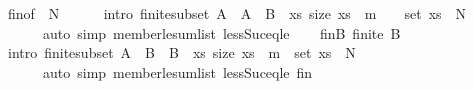 \begin{isabellebody}
\ fin{\isacharbrackleft}{\kern0pt}of\ {\isacharunderscore}{\kern0pt}\ {\isachardoublequoteopen}N{\isacharplus}{\kern0pt}{}{\isachardoublequoteclose}{\isacharbrackright}{\kern0pt}\isanewline
\ \ \ \ \isamarkupfalse%
\ {\isacharparenleft}{\kern0pt}intro\ finite{\isacharunderscore}{\kern0pt}subset{\isacharbrackleft}{\kern0pt}\ {\isacharquery}{\kern0pt}A\ {\isacharequal}{\kern0pt}\ {\isachardoublequoteopen}{\isacharquery}{\kern0pt}A{\isachardoublequoteclose}\ \ {\isacharquery}{\kern0pt}B\ {\isacharequal}{\kern0pt}\ {\isachardoublequoteopen}{\isacharbraceleft}{\kern0pt}xs{\isachardot}{\kern0pt}\ size\ xs\ {\isacharequal}{\kern0pt}\ m\ {\isacharminus}{\kern0pt}\ {}\ {\isasymand}\ set\ xs\ {\isasymsubseteq}\ {\isacharbraceleft}{\kern0pt}{}{\isachardot}{\kern0pt}{\isachardot}{\kern0pt}{\isacharless}{\kern0pt}N{\isacharplus}{\kern0pt}{}{\isacharbraceright}{\kern0pt}{\isacharbraceright}{\kern0pt}{\isachardoublequoteclose}{\isacharbrackright}{\kern0pt}{\isacharparenright}{\kern0pt}\isanewline
\ \ \ \ \ \ {\isacharparenleft}{\kern0pt}auto\ simp{\isacharcolon}{\kern0pt}\ member{\isacharunderscore}{\kern0pt}le{\isacharunderscore}{\kern0pt}sum{\isacharunderscore}{\kern0pt}list\ less{\isacharunderscore}{\kern0pt}Suc{\isacharunderscore}{\kern0pt}eq{\isacharunderscore}{\kern0pt}le{\isacharparenright}{\kern0pt}\isanewline
\ \ \isamarkupfalse%
\ fin{\isacharunderscore}{\kern0pt}B{\isacharcolon}{\kern0pt}\ {\isachardoublequoteopen}finite\ {\isacharquery}{\kern0pt}B{\isachardoublequoteclose}\isanewline
\ \ \ \ \isamarkupfalse%
\ {\isacharparenleft}{\kern0pt}intro\ finite{\isacharunderscore}{\kern0pt}subset{\isacharbrackleft}{\kern0pt}\ {\isacharquery}{\kern0pt}A\ {\isacharequal}{\kern0pt}\ {\isachardoublequoteopen}{\isacharquery}{\kern0pt}B{\isachardoublequoteclose}\ \ {\isacharquery}{\kern0pt}B\ {\isacharequal}{\kern0pt}\ {\isachardoublequoteopen}{\isacharbraceleft}{\kern0pt}xs{\isachardot}{\kern0pt}\ size\ xs\ {\isacharequal}{\kern0pt}\ m\ {\isasymand}\ set\ xs\ {\isasymsubseteq}\ {\isacharbraceleft}{\kern0pt}{}{\isachardot}{\kern0pt}{\isachardot}{\kern0pt}{\isacharless}{\kern0pt}N{\isacharbraceright}{\kern0pt}{\isacharbraceright}{\kern0pt}{\isachardoublequoteclose}{\isacharbrackright}{\kern0pt}{\isacharparenright}{\kern0pt}\isanewline
\ \ \ \ \ \ {\isacharparenleft}{\kern0pt}auto\ simp{\isacharcolon}{\kern0pt}\ member{\isacharunderscore}{\kern0pt}le{\isacharunderscore}{\kern0pt}sum{\isacharunderscore}{\kern0pt}list\ less{\isacharunderscore}{\kern0pt}Suc{\isacharunderscore}{\kern0pt}eq{\isacharunderscore}{\kern0pt}le\ fin{\isacharparenright}{\kern0pt}\isanewline

\end{isabellebody}
